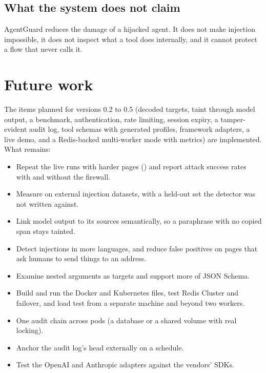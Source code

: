 \documentclass[11pt,a4paper]{article}
\newcommand{\code}[1]{\texttt{\detokenize{#1}}}
\newcommand{\product}{AgentGuard}
\begin{document}
\subsection{What the system does not claim}
\product{} reduces the damage of a hijacked agent. It does not make injection impossible, it does not inspect what a tool does internally, and it cannot protect a flow that never calls it.

\section{Future work}
The items planned for versions 0.2 to 0.5 (decoded targets, taint through model output, a benchmark, authentication, rate limiting, session expiry, a tamper-evident audit log, tool schemas with generated profiles, framework adapters, a live demo, and a Redis-backed multi-worker mode with metrics) are implemented. What remains:
\begin{itemize}
  \item Repeat the live runs with harder pages (\code{--hard --runs N}) and report attack success rates with and without the firewall.
  \item Measure on external injection datasets, with a held-out set the detector was not written against.
  \item Link model output to its sources semantically, so a paraphrase with no copied span stays tainted.
  \item Detect injections in more languages, and reduce false positives on pages that ask humans to send things to an address.
  \item Examine nested arguments as targets and support more of JSON Schema.
  \item Build and run the Docker and Kubernetes files, test Redis Cluster and failover, and load test from a separate machine and beyond two workers.
  \item One audit chain across pods (a database or a shared volume with real locking).
  \item Anchor the audit log's head externally on a schedule.
  \item Test the OpenAI and Anthropic adapters against the vendors' SDKs.
\end{itemize}

\appendix
\end{document}
